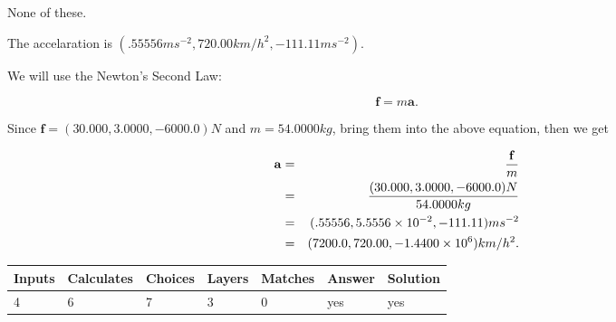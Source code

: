 \documentclass[12pt]{article}
\begin{document}
 
 None of these.
 
 
\noindent{}
 
 
The accelaration is
$(
.55556ms^{-2},
720.00km/h^2,
-111.11ms^{-2}
).
$
 
 
\noindent{}
 
 
 
 
 
 
\noindent{}
 
 

We will use the Newton's Second Law:
 
\[
\mathbf{f}=m\mathbf{a}.
\]
 
Since $\mathbf{f}=( %
30.000,  %
3.0000,  %
-6000.0 )N$
and $m= %
54.0000kg$, bring them into the above equation, then we get
 
\begin{eqnarray*}
\mathbf{a}&=&\frac{\mathbf{f}}m  \\
&=&\frac{(
30.000 ,
3.0000 ,
-6000.0 )N
}{ %
54.0000 kg}  \\
&=&(
.55556 ,
5.5556 \times 10^{-2},
-111.11
)ms^{-2} \\
&=&(
7200.0 ,
720.00 ,
-1.4400 \times 10^{6}
)km/h^2.
\end{eqnarray*}
 
 
 
\noindent{}
 
 

 
\vspace{0.3in}
   
   
   
   
\noindent\begin{tabular}{|l|l|l|l|l|l|l|}
 \hline
Inputs & Calculates & Choices & Layers & Matches & Answer & Solution \\ \hline
           4 & 
           6 & 
           7
  & 
           3 & 
           0 & 
  yes & 
  yes 
  \\ \hline
 \end{tabular}
   
   
   
   
\noindent{}
   
\end{document}
